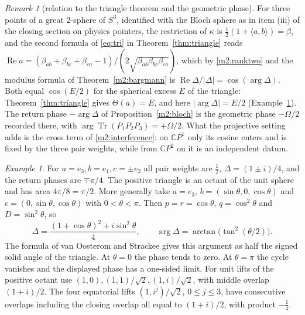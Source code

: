 \documentclass[11pt,reqno]{amsart}
\theoremstyle{definition}
\theoremstyle{remark}
\newtheorem{remark}[theorem]{Remark}
\newtheorem{example}[theorem]{Example}
\numberwithin{equation}{section}
\newcommand{\C}{\mathbb{C}}
\newcommand{\re}{\operatorname{Re}}
\newcommand{\ip}[2]{\langle #1,#2\rangle}
\begin{document}
\begin{remark}[relation to the triangle theorem and the geometric phase]\label{m2:triangle-link}
For three points of a great $2$-sphere of $S^3$, identified with the Bloch sphere as in item (iii) of the closing section on physics pointers, the restriction of $\kappa$
is $\tfrac12(1+\ip ab)=\beta$, and the second formula of \eqref{eq:tri} in Theorem~\ref{thm:triangle} reads
$\re a=(\beta_{ab}+\beta_{bc}+\beta_{ca}-1)/(2\sqrt{\beta_{ab}\beta_{bc}\beta_{ca}})$, which by \eqref{m2:ranktwo} and the modulus formula of
Theorem~\ref{m2:bargmann} is $\re\Delta/|\Delta|=\cos(\arg\Delta)$.  Both equal $\cos(E/2)$ for the spherical excess $E$ of the triangle:
Theorem~\ref{thm:triangle} gives $\Theta(a)=E$, and here $|\arg\Delta|=E/2$ (Example~\ref{m2:octant}).  The return phase
$-\arg\Delta$ of Proposition~\ref{m2:bloch} is the geometric phase $-\Omega/2$ recorded there, with
$\arg\operatorname{Tr}(P_1P_2P_3)=+\Omega/2$.  What the projective setting adds is the cross term of \eqref{m2:interference}: on
$\C P^1$ only its cosine enters and is fixed by the three pair weights, while from $\C P^2$ on it is an independent datum.
\end{remark}

\begin{example}\label{m2:octant}
For $a=e_3,b=e_1,c=\pm e_2$ all pair weights are $\tfrac12$, $\Delta=(1\pm i)/4$, and the return phases are $\mp\pi/4$.  The positive triangle
is an octant of the unit sphere and has area $4\pi/8=\pi/2$.  More generally take $a=e_3$, $b=(\sin\theta,0,\cos\theta)$ and
$c=(0,\sin\theta,\cos\theta)$ with $0<\theta<\pi$.  Then $p=r=\cos\theta$, $q=\cos^2\theta$ and $D=\sin^2\theta$, so
\[
 \Delta=\frac{(1+\cos\theta)^2+i\sin^2\theta}{4},\qquad \arg\Delta=\arctan\bigl(\tan^2(\theta/2)\bigr).
\]
The formula of van Oosterom and Strackee \cite{VOS} gives this argument as half the signed solid angle of the triangle.  At $\theta=0$ the
phase tends to zero.  At $\theta=\pi$ the cycle vanishes and the displayed phase has a one-sided limit.  For unit lifts of the positive
octant use $(1,0),(1,1)/\sqrt2,(1,i)/\sqrt2$, with middle overlap $(1+i)/2$.  The four equatorial lifts $(1,i^j)/\sqrt2$, $0\le j\le3$, have
consecutive overlaps including the closing overlap all equal to $(1+i)/2$, with product $-\tfrac14$.
\end{example}
\end{document}
